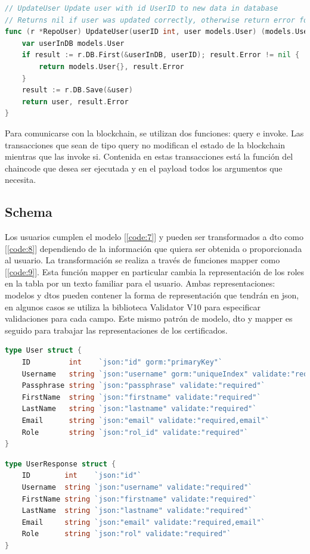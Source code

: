 \begin{lstlisting}[language=Go,caption={Función para modificar un usuario}, label={code:6}]
// UpdateUser Update user with id UserID to new data in database
// Returns nil if user was updated correctly, otherwise return error found
func (r *RepoUser) UpdateUser(userID int, user models.User) (models.User, error) {
	var userInDB models.User
	if result := r.DB.First(&userInDB, userID); result.Error != nil {
		return models.User{}, result.Error
	}
	result := r.DB.Save(&user)
	return user, result.Error
}
\end{lstlisting}

Para comunicarse con la blockchain, se utilizan dos funciones: query e invoke. Las transacciones que sean de tipo query no modifican el estado de la blockchain mientras que las invoke si. Contenida en estas transacciones está la función del chaincode que desea ser ejecutada y en el payload todos los argumentos que necesita.

\subsection{Schema}
Los usuarios cumplen el modelo [\ref{code:7}] y pueden ser transformados a dto como [\ref{code:8}] dependiendo de la información que quiera ser obtenida o proporcionada al usuario. La transformación se realiza a través de funciones mapper como [\ref{code:9}]. Esta función mapper en particular cambia la representación de los roles en la tabla por un texto familiar para el usuario. Ambas representaciones: modelos y dtos pueden contener la forma de representación que tendrán en json, en algunos casos se utiliza la biblioteca Validator V10 para especificar validaciones para cada campo. Este mismo patrón de modelo, dto y mapper es seguido para trabajar las representaciones de los certificados.

\begin{lstlisting}[language=Go,caption={Modelo de usuarios}, label={code:7}]
type User struct {
	ID         int    `json:"id" gorm:"primaryKey"`
	Username   string `json:"username" gorm:"uniqueIndex" validate:"required"`
	Passphrase string `json:"passphrase" validate:"required"`
	FirstName  string `json:"firstname" validate:"required"`
	LastName   string `json:"lastname" validate:"required"`
	Email      string `json:"email" validate:"required,email"`
	Role       string `json:"rol_id" validate:"required"`
}
\end{lstlisting}

\begin{lstlisting}[language=Go,caption={DTO UserResponse, encargado de presentar los detalles sobre usuarios de la base de datos}, label={code:8}]
type UserResponse struct {
	ID        int    `json:"id"`
	Username  string `json:"username" validate:"required"`
	FirstName string `json:"firstname" validate:"required"`
	LastName  string `json:"lastname" validate:"required"`
	Email     string `json:"email" validate:"required,email"`
	Role      string `json:"rol" validate:"required"`
}
\end{lstlisting}

